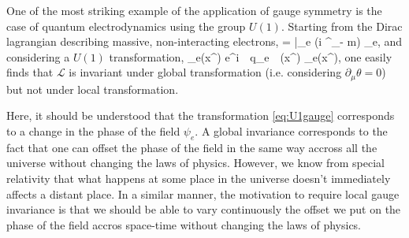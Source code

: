     One of the most striking example of the application of gauge symmetry is the case of
    quantum electrodynamics using the group $U(1)$. Starting from the Dirac lagrangian
    describing massive, non-interacting electrons,
    {
        =
        \bar{\psi_e} (i \gamma^\mu \partial_\mu - m) \psi_e,
    }
    and considering a $U(1)$ transformation,
    {
        \psi_e(x^\mu)
        \rightarrow
        e^{i \,\cdot\, q_e \,\cdot\, \theta(x^\mu)} \psi_e(x^\mu),
    }
    one easily finds that $\mathcal{L}$ is invariant under global transformation (i.e.
    considering $\partial_\mu \theta = 0$) but not under local transformation.

    Here, it should be understood that the transformation \ref{eq:U1gauge} corresponds
    to a change in the phase of the field $\psi_e$. A global invariance corresponds to the
    fact that one can offset the phase of the field in the same way accross all the universe
    without changing the laws of physics. However, we know from special relativity
    that what happens at some place in the universe doesn't immediately affects a distant
    place. In a similar manner, the motivation to require local gauge invariance is that
    we should be able to vary continuously the offset we put on the phase of the field accros
    space-time without changing the laws of physics.


